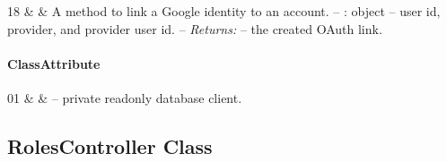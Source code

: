 \begin{ClassMethodTable}
18 &  &
A method to link a Google identity to an account.
\newline -- : object -- user id, provider, and provider user id.
\newline -- \textit{Returns:}  -- the created OAuth link. \\ \hline
\end{ClassMethodTable}

\paragraph{ClassAttribute}
\begin{ClassAttributeTable}
01 &  &  -- private readonly database client. \\ \hline
\end{ClassAttributeTable}

\subsection{RolesController Class}

